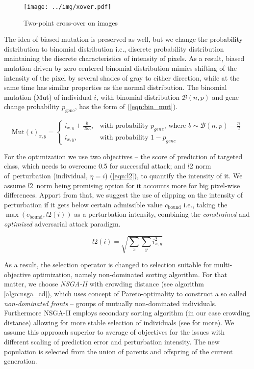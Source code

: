 \begin{figure}
    \centering
    \texttt{[image: ../img/xover.pdf]}
    \caption{Two-point cross-over on images}
    \label{fig:xover}
\end{figure}

The idea of biased mutation is preserved as well, but we change the probability distribution to binomial distribution i.e., discrete probability distribution maintaining the discrete characteristics of intensity of pixels. As a result, biased mutation driven by zero centered binomial distribution mimics shifting of the intensity of the pixel by several shades of gray to either direction, while at the same time has similar properties as the normal distribution. The binomial mutation (Mut) of individual $i$, with binomial distribution $\mathcal{B}(n, p)$ and gene change probability $p_\text{gene}$, has the form of (\ref{eqn:bin_mut}).

\begin{equation} \label{eqn:bin_mut}
\text{Mut}(i)_{x,y} =
\begin{cases}
    i_{x, y} + \frac{b}{255}, & \text{with probability } p_{gene} \text{, where } b \sim \mathcal{B}(n, p) - \frac{n}{2}\\
    i_{x, y}, & \text{with probability } 1 - p_{gene}
\end{cases}
\end{equation}

For the optimization we use two objectives -- the score of prediction of targeted class, which needs to overcome 0.5 for successful attack; and $l2$ norm of~perturbation (individual, $\eta = i$) (\ref{eqn:l2}), to quantify the intensity of it. We assume $l2$~norm being promising option for it accounts more for big pixel-wise differences. Appart from that, we suggest the use of clipping on the intensity of perturbation if it gets below certain admissible value $c_\text{bound}$ i.e., taking the $\max(c_\text{bound}, l2(i))$ as a perturbation intensity, combining the \emph{constrained} and \emph{optimized} adversarial attack paradigm.

\begin{equation} \label{eqn:l2}
l2(i) = \sqrt{\sum\limits_x\sum\limits_y i_{x, y}^2}
\end{equation}

As a result, the selection operator is changed to selection suitable for multi-objective optimization, namely non-dominated sorting algorithm. For that matter, we choose \emph{NSGA-II} with crowding distance (see algorithm \ref{algo:nsga_cd}), which uses concept of Pareto-optimality to construct a so called \emph{non-dominated fronts} -- groups of mutually non-dominated individuals. Furthermore NSGA-II employs secondary sorting algorithm (in our case crowding distance) allowing for more stable selection of individuals (see \cite{nsga} for more). We assume this approach superior to average of objectives for the issues with different scaling of prediction error and perturbation intensity. The new population is selected from the union of parents and offspring of the current generation.

